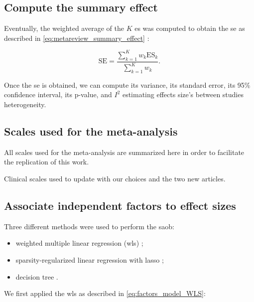 \documentclass[12pt,a4paper,english]{article}
\begin{document}
\subsection{Compute the summary effect}

Eventually, the weighted average of the $K$ \gls{es} was computed to obtain the \gls{se} as described in 
\cref{eq:metareview_summary_effect} \citep{Borenstein2009}:

\begin{equation}
\label{eq:metareview_summary_effect}
\text{SE} = \frac{\sum_{k=1}^{K} w_k \text{ES}_k} {\sum_{k=1}^{K} w_k}.
\end{equation} 

Once the \gls{se}  is obtained, we can compute its variance, its standard error, its 95\% confidence interval, its p-value, 
and $I^2$ estimating effects size's between studies heterogeneity. 

\subsection{Scales used for the meta-analysis}

All scales used for the meta-analysis are summarized here in order to facilitate the replication of this work.

\begin{table}[h!]
  \centering
  \caption{Clinical scales used to update \citet{Cortese2016} with our choices and the two new articles.}

  \label{Table:Table_mr_clinical_scales_update_cortese}
\end{table}


\subsection{Associate independent factors to effect sizes}

Three different methods were used to perform the \gls{saob}:
\begin{itemize}
	\item weighted multiple linear regression (\gls{wls}) \citep{Montgomery2012}; 
	\item sparsity-regularized linear regression with \gls{lasso} \citep{Tibshirani1996};
	\item decision tree \citep{Quinlan1986}.
\end{itemize}

We first applied the \gls{wls} as described in \cref{eq:factors_model_WLS}: 
\end{document}
